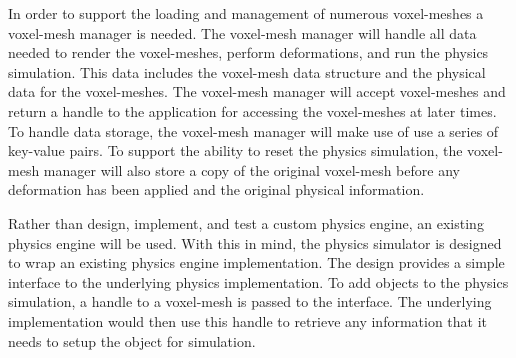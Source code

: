In order to support the loading and management of numerous voxel-meshes a voxel-mesh manager is 
needed. The voxel-mesh manager will handle all data needed to render the voxel-meshes, perform
deformations, and run the physics simulation. This data includes the voxel-mesh data structure and
the physical data for the voxel-meshes. The voxel-mesh manager will accept voxel-meshes and return a 
handle to the application for accessing the voxel-meshes at later times. 
To handle data storage, the voxel-mesh manager will make use of use a series of key-value pairs. To 
support the ability to reset the physics simulation, the voxel-mesh manager will also store a
copy of the original voxel-mesh before any deformation has been applied and the original physical 
information.

Rather than design, implement, and test a custom physics engine, an existing physics engine will be
used. With this in mind, the physics simulator is designed to wrap an existing physics engine 
implementation. The design provides a simple interface to the underlying physics implementation. To 
add objects to the physics simulation, a handle to a voxel-mesh is passed to the interface. The 
underlying implementation would then use this handle to retrieve any information that it needs to 
setup the object for simulation. 
